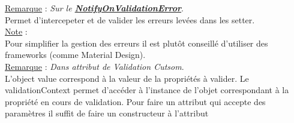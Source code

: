 \documentclass[a4paper,12pt,twoside]{article}
\newcommand{\urlcolor}{magenta}  %
\newcommand{\keycolor}{purple} %
\newcommand{\rem}[2]{\noindent\underline{Remarque} : \textit{#1}.\\ \indent #2}
\newcommand{\note}[1]{\noindent\underline{Note} : \\ \indent #1}
\newcommand{\keyref}[2]{\hypersetup{urlcolor=\keycolor} \href{#1}{\textbf{#2}}\hypersetup{urlcolor=\urlcolor}}
\begin{document}
\rem{Sur le \keyref{https://docs.microsoft.com/en-us/dotnet/api/system.windows.data.binding.notifyonvalidationerror?redirectedfrom=MSDN&view=windowsdesktop-6.0#System_Windows_Data_Binding_NotifyOnValidationError}{NotifyOnValidationError}}{Permet d'intercepeter et de valider les erreurs levées dans les setter.}\\

\note{Pour simplifier la gestion des erreurs il est plutôt conseillé d'utiliser des frameworks (comme Material Design).}\\

\rem{Dans attribut de Validation Cutsom}{L'object value correspond à la valeur de la propriétés à valider. Le validationContext permet d'accéder à l'instance de l'objet correspondant à la propriété en cours de validation. Pour faire un attribut qui accepte des paramètres il suffit de faire un constructeur à l'attribut}\\
\end{document}
